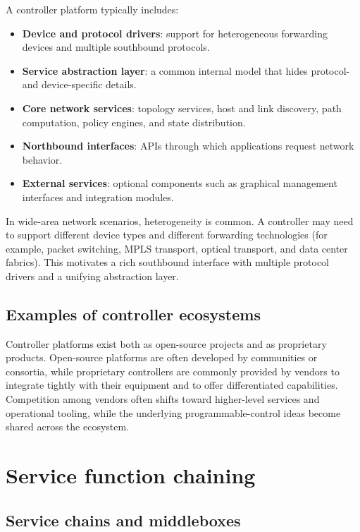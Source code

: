\documentclass[11pt,a4paper,openany]{report}
\begin{document}
A controller platform typically includes:

\begin{itemize}
\item \textbf{Device and protocol drivers}: support for heterogeneous forwarding devices and multiple southbound protocols.
\item \textbf{Service abstraction layer}: a common internal model that hides protocol- and device-specific details.
\item \textbf{Core network services}: topology services, host and link discovery, path computation, policy engines, and state distribution.
\item \textbf{Northbound interfaces}: APIs through which applications request network behavior.
\item \textbf{External services}: optional components such as graphical management interfaces and integration modules.
\end{itemize}

In wide-area network scenarios, heterogeneity is common. A controller may need to support different device types and different forwarding technologies (for example, packet switching, MPLS transport, optical transport, and data center fabrics). This motivates a rich southbound interface with multiple protocol drivers and a unifying abstraction layer.

\subsection{Examples of controller ecosystems}

Controller platforms exist both as open-source projects and as proprietary products. Open-source platforms are often developed by communities or consortia, while proprietary controllers are commonly provided by vendors to integrate tightly with their equipment and to offer differentiated capabilities. Competition among vendors often shifts toward higher-level services and operational tooling, while the underlying programmable-control ideas become shared across the ecosystem.

\section{Service function chaining}

\subsection{Service chains and middleboxes}
\end{document}
